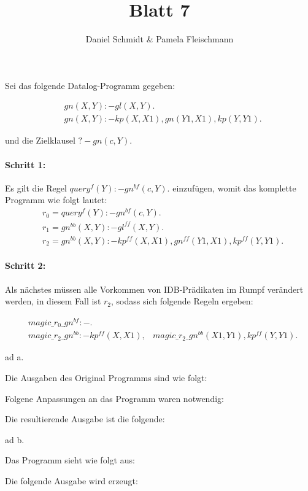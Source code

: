 \documentclass[12pt,a4paper]{amsart}
\begin{document}
\title{Blatt 7}

\author{Daniel Schmidt \& Pamela Fleischmann}

\maketitle

\begin{aufgabe1}
Sei das folgende Datalog-Programm gegeben:

\begin{align*}
&gn(X,Y) :- gl(X,Y). \\
&gn(X,Y) :- kp(X,X1), gn(Y1,X1), kp(Y,Y1).
\end{align*}

und die Zielklausel $? - gn(c,Y).$

\paragraph{Schritt 1:}
Es gilt die Regel $query^{f}(Y) :- gn^{bf}(c,Y).$ einzufügen, womit das komplette Programm wie folgt lautet: 
\begin{align*}
&r_0 = query^{f}(Y) :- gn^{bf}(c,Y). \\
&r_1 = gn^{bb}(X,Y) :- gl^{ff}(X,Y). \\
&r_2 = gn^{bb}(X,Y) :- kp^{ff}(X,X1), gn^{ff}(Y1,X1), kp^{ff}(Y,Y1).
\end{align*}

\paragraph{Schritt 2:}
Als nächstes müssen alle Vorkommen von IDB-Prädikaten im Rumpf verändert werden, in diesem Fall ist $r_2$, sodass sich folgende Regeln ergeben: 

\begin{align*}
&magic\_r_0\_gn^{bf} :- . \\
&magic\_r_2\_gn^{bb} :- kp^{ff}(X,X1), &magic\_r_2\_gn^{bb}(X1,Y1), kp^{ff}(Y,Y1).
\end{align*}

\end{aufgabe1}


\begin{aufgabe1}
\end{aufgabe1}

\begin{aufgabe1}
\end{aufgabe1}

\begin{aufgabe1}
ad a.

Die Ausgaben des Original Programms sind wie folgt:


Folgene Anpassungen an das Programm waren notwendig:


Die resultierende Ausgabe ist die folgende:


ad b.

Das Programm sieht wie folgt aus:


Die folgende Ausgabe wird erzeugt:


\end{aufgabe1}
\end{document}
